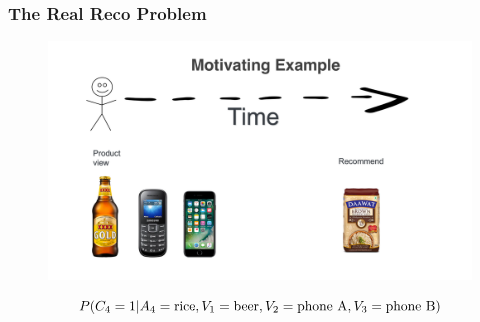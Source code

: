  \begin{frame}
  \frametitle{The Real Reco Problem}
 
 
   \begin{figure}[h!]
     \includegraphics[scale=0.25]{images/mot_ex4.png}
       \centering
       \label{motex1}
   \end{figure}

   \[
   P(C_4=1|A_4={\rm rice},  V_1 = {\rm beer}, V_2 = {\rm phone ~ A}, V_3 = {\rm phone ~ B}) 
   \]
   

 \end{frame}


